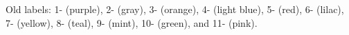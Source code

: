     Old labels:
    1- (purple),              %
    2- (gray),            %
    3- (orange),         %
    4- (light blue),          %
    5- (red),                 %
    6- (lilac),                %
    7- (yellow),         %
    8- (teal),        %
    9- (mint),                 %
    10- (green), and      %
    11- (pink).       %